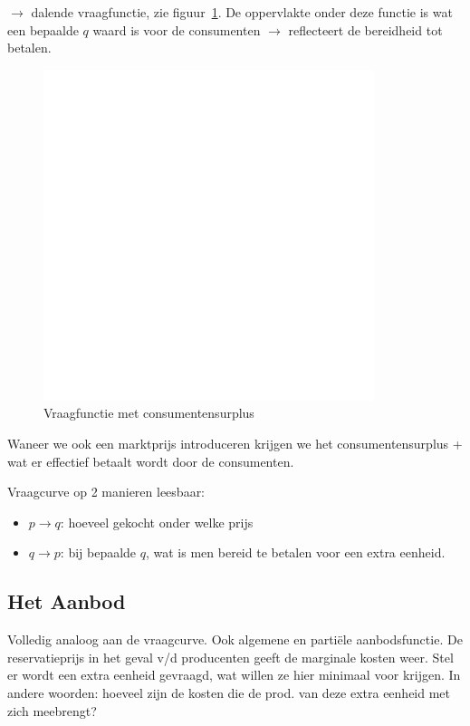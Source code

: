 $\rightarrow$ dalende vraagfunctie, zie figuur~\ref{fig:vraagfunc}. De oppervlakte onder deze functie is wat een bepaalde $q$ waard is voor de consumenten $\rightarrow$ reflecteert de bereidheid tot betalen.
\begin{figure}[htbp]
	\centering
	\includegraphics[scale=0.4]{Images/white.png}
	\caption{Vraagfunctie met consumentensurplus}
	\label{fig:vraagfunc}
\end{figure}

Waneer we ook een marktprijs introduceren krijgen we het consumentensurplus + wat er effectief betaalt wordt door de consumenten.

Vraagcurve op 2 manieren leesbaar:
\begin{itemize}
	\item $p \rightarrow q$: hoeveel gekocht onder welke prijs
    \item $q \rightarrow p$: bij bepaalde $q$, wat is men bereid te betalen voor een extra eenheid.
\end{itemize}

\subsection{Het Aanbod}
Volledig analoog aan de vraagcurve. Ook algemene en parti\"{e}le aanbodsfunctie. De reservatieprijs in het geval v/d producenten geeft de marginale kosten weer. Stel er wordt een extra eenheid gevraagd, wat willen ze hier minimaal voor krijgen. In andere woorden: hoeveel zijn de kosten die de prod. van deze extra eenheid met zich meebrengt?

